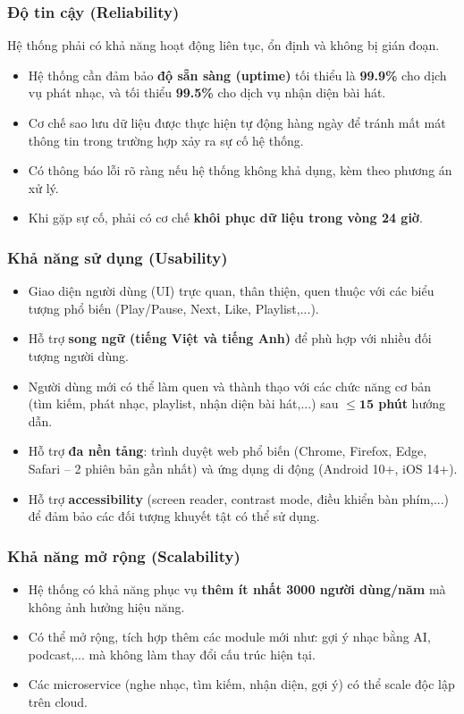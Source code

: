\documentclass[a4paper]{article}
\begin{document}
\subsubsection{Độ tin cậy (Reliability)}
Hệ thống phải có khả năng hoạt động liên tục, ổn định và không bị gián đoạn.
\begin{itemize}
	\item Hệ thống cần đảm bảo \textbf{độ sẵn sàng (uptime)} tối thiểu là \textbf{99.9\%} cho dịch vụ phát nhạc, và tối thiểu \textbf{99.5\%} cho dịch vụ nhận diện bài hát.
	\item Cơ chế sao lưu dữ liệu được thực hiện tự động hàng ngày để tránh mất mát thông tin trong trường hợp xảy ra sự cố hệ thống.
	\item Có thông báo lỗi rõ ràng nếu hệ thống không khả dụng, kèm theo phương án xử lý.
	\item Khi gặp sự cố, phải có cơ chế \textbf{khôi phục dữ liệu trong vòng 24 giờ}.
\end{itemize}

\subsubsection{Khả năng sử dụng (Usability)}
\begin{itemize}
	\item Giao diện người dùng (UI) trực quan, thân thiện, quen thuộc với các biểu tượng phổ biến (Play/Pause, Next, Like, Playlist,...).
	\item Hỗ trợ \textbf{song ngữ (tiếng Việt và tiếng Anh)} để phù hợp với nhiều đối tượng người dùng.
	\item Người dùng mới có thể làm quen và thành thạo với các chức năng cơ bản (tìm kiếm, phát nhạc, playlist, nhận diện bài hát,...) sau \textbf{$\leq \mathbf{15}$ phút} hướng dẫn.
	\item Hỗ trợ \textbf{đa nền tảng}: trình duyệt web phổ biến (Chrome, Firefox, Edge, Safari – 2 phiên bản gần nhất) và ứng dụng di động (Android 10+, iOS 14+).
	\item Hỗ trợ \textbf{accessibility} (screen reader, contrast mode, điều khiển bàn phím,...) để đảm bảo các đối tượng khuyết tật có thể sử dụng.
\end{itemize}

\subsubsection{Khả năng mở rộng (Scalability)}
\begin{itemize}
	\item Hệ thống có khả năng phục vụ \textbf{thêm ít nhất 3000 người dùng/năm} mà không ảnh hưởng hiệu năng.
	\item Có thể mở rộng, tích hợp thêm các module mới như: gợi ý nhạc bằng AI, podcast,... mà không làm thay đổi cấu trúc hiện tại.
	\item Các microservice (nghe nhạc, tìm kiếm, nhận diện, gợi ý) có thể scale độc lập trên cloud.
\end{itemize}
\end{document}
